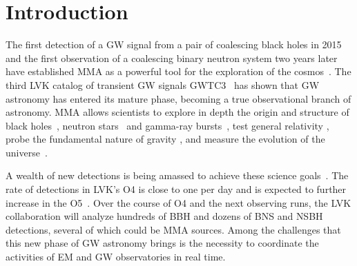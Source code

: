 \section{Introduction} \label{intro}

The first detection of a \ac{GW} signal from a pair of coalescing black holes in 2015 and the first observation of a coalescing binary neutron system two years later have established \ac{MMA} as
a powerful tool for the exploration of the cosmos~\cite{LIGOScientific:2016aoc,LIGOScientific:2017vwq,LIGOScientific:2018cki}. The third \ac{LVK} catalog of transient \ac{GW} signals
\ac{GWTC3}~\cite{LIGOScientific:2021djp} has shown that \ac{GW} astronomy has entered its mature phase, becoming a true observational branch of astronomy. \ac{MMA} allows scientists to explore
in depth the origin and structure of black holes~\cite{Schmidt:2020ekt,Nitz:2021zwj}, neutron stars~\cite{Lasky:2015uia,Baiotti:2016qnr} and gamma-ray bursts~\cite{Ciolfi:2018tal}, test general
relativity , probe the fundamental nature of gravity , and measure the evolution of the
universe~\cite{LIGOScientific:2021sio,LIGOScientific:2021psn,LIGOScientific:2021aug}. 

A wealth of new detections is being amassed to achieve these science goals~\cite{LIGOScientific:2014pky,VIRGO:2014yos}. The rate of detections in \ac{LVK}'s \ac{O4} is close to one per day and
is expected to further increase in the \ac{O5}~\cite{KAGRA:2013rdx}. Over the course of \ac{O4} and the next observing runs, the \ac{LVK} collaboration will analyze hundreds of \ac{BBH} and
dozens of \ac{BNS} and \ac{NSBH} detections, several of which could be \ac{MMA} sources. Among the challenges that this new phase of \ac{GW} astronomy brings is the necessity to coordinate the
activities of \ac{EM} and \ac{GW} observatories in real time. 

